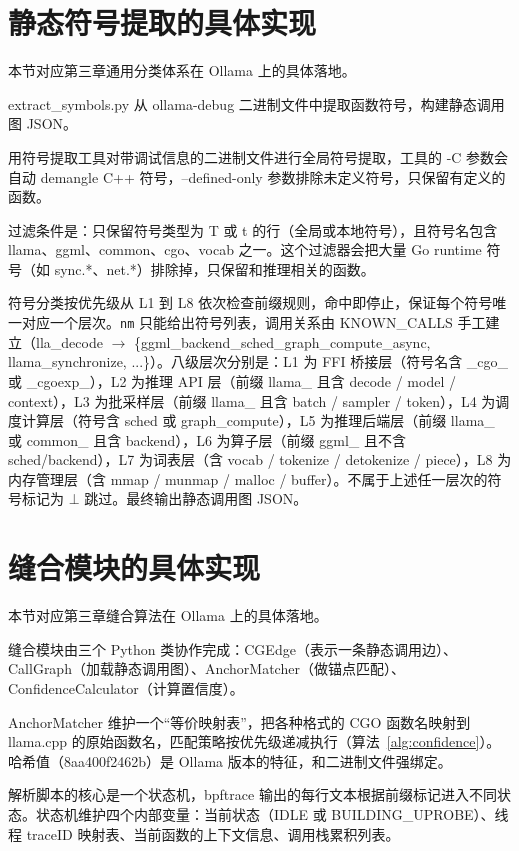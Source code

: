 \section{静态符号提取的具体实现}

本节对应第三章通用分类体系在 Ollama 上的具体落地。

extract\_symbols.py 从 ollama-debug 二进制文件中提取函数符号，构建静态调用图 JSON。

用符号提取工具对带调试信息的二进制文件进行全局符号提取，工具的 -C 参数会自动 demangle C++ 符号，--defined-only 参数排除未定义符号，只保留有定义的函数。

过滤条件是：只保留符号类型为 T 或 t 的行（全局或本地符号），且符号名包含 llama、ggml、common、cgo、vocab 之一。这个过滤器会把大量 Go runtime 符号（如 sync.*、net.*）排除掉，只保留和推理相关的函数。

符号分类按优先级从 L1 到 L8 依次检查前缀规则，命中即停止，保证每个符号唯一对应一个层次。\texttt{nm} 只能给出符号列表，调用关系由 KNOWN\_CALLS 手工建立（lla\_decode $\to$ \{ggml\_backend\_sched\_graph\_compute\_async, llama\_synchronize, ...\}）。八级层次分别是：L1 为 FFI 桥接层（符号名含 \_cgo\_ 或 \_cgoexp\_），L2 为推理 API 层（前缀 llama\_ 且含 decode / model / context），L3 为批采样层（前缀 llama\_ 且含 batch / sampler / token），L4 为调度计算层（符号含 sched 或 graph\_compute），L5 为推理后端层（前缀 llama\_ 或 common\_ 且含 backend），L6 为算子层（前缀 ggml\_ 且不含 sched/backend），L7 为词表层（含 vocab / tokenize / detokenize / piece），L8 为内存管理层（含 mmap / munmap / malloc / buffer）。不属于上述任一层次的符号标记为 $\bot$ 跳过。最终输出静态调用图 JSON。

\section{缝合模块的具体实现}

本节对应第三章缝合算法在 Ollama 上的具体落地。

缝合模块由三个 Python 类协作完成：CGEdge（表示一条静态调用边）、CallGraph（加载静态调用图）、AnchorMatcher（做锚点匹配）、ConfidenceCalculator（计算置信度）。

AnchorMatcher 维护一个“等价映射表”，把各种格式的 CGO 函数名映射到 llama.cpp 的原始函数名，匹配策略按优先级递减执行（算法~\ref{alg:confidence}）。哈希值（8aa400f2462b）是 Ollama 版本的特征，和二进制文件强绑定。

解析脚本的核心是一个状态机，bpftrace 输出的每行文本根据前缀标记进入不同状态。状态机维护四个内部变量：当前状态（IDLE 或 BUILDING\_UPROBE）、线程 traceID 映射表、当前函数的上下文信息、调用栈累积列表。

